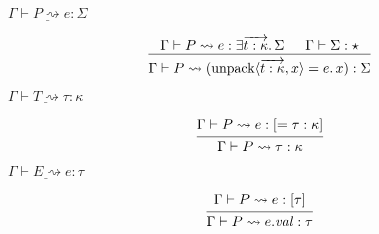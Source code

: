 \documentclass[lualatex,12pt,unicode]{article}
\begin{document}
\pagestyle{empty}

$\underline{\Gamma \vdash P \rightsquigarrow e: \Sigma}$

\[
    \begin{prooftree}
        \hypo{\Gamma \vdash P \rightsquigarrow e: \exists \overrightarrow{t: \kappa}\ldotp \Sigma}
        \hypo{\Gamma \vdash \Sigma: \star}
        \infer2{\Gamma \vdash P \rightsquigarrow (\mathrm{unpack}\langle \overrightarrow{t: \kappa}, x\rangle = e\ldotp x): \Sigma}
    \end{prooftree}
\]

$\underline{\Gamma \vdash T \rightsquigarrow \tau: \kappa}$

\[
    \begin{prooftree}
        \hypo{\Gamma \vdash P \rightsquigarrow e: [= \tau: \kappa]}
        \infer1{\Gamma \vdash P \rightsquigarrow \tau: \kappa}
    \end{prooftree}
\]

$\underline{\Gamma \vdash E \rightsquigarrow e: \tau}$

\[
    \begin{prooftree}
        \hypo{\Gamma \vdash P \rightsquigarrow e: [\tau]}
        \infer1{\Gamma \vdash P \rightsquigarrow e.\mathit{val}: \tau}
    \end{prooftree}
\]
\end{document}
